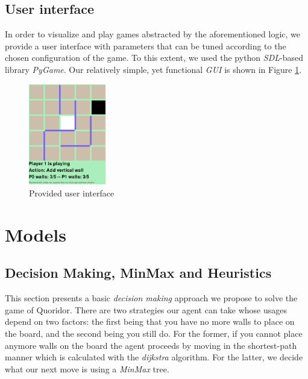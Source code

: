 \documentclass[journal, a4paper]{IEEEtran}
\begin{document}
\subsection{User interface}
In order to visualize and play games abstracted by the aforementioned logic, we provide a user interface with parameters that can be tuned according to the chosen configuration of the game. To this extent, we used the python \textit{SDL}-based library \textit{PyGame}\cite{pygame}. Our relatively simple, yet functional \textit{GUI} is shown in Figure \ref{fig:gui}.
\begin{figure}
    \centering
    \includegraphics[width=0.3\textwidth]{figures/gui.png}
    \caption{Provided user interface}
    \label{fig:gui}
\end{figure}


\section{Models}
\label{sec:models}

\subsection{Decision Making, MinMax and Heuristics}\label{ssec:heuristics}

This section presents a basic \textit{decision making} approach we propose to solve the game of Quoridor. There are two strategies our agent can take whose usages depend on two factors: the first being that you have no more walls to place on the board, and the second being you still do.
For the former, if you cannot place anymore walls on the board the agent proceeds by moving in the shortest-path manner which is calculated with the \textit{dijkstra} algorithm. 
For the latter, we decide what our next move is using a \textit{MinMax} tree.
\end{document}
